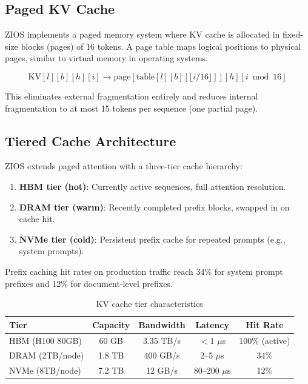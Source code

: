 \documentclass[11pt,a4paper]{article}
\begin{document}
\subsection{Paged KV Cache}

ZIOS implements a paged memory system where KV cache is allocated in fixed-size blocks (pages) of 16 tokens. A page table maps logical positions to physical pages, similar to virtual memory in operating systems.

\begin{equation}
\text{KV}[l][b][h][i] \to \text{page}[\text{table}[l][b][\lfloor i/16 \rfloor]][h][i \bmod 16]
\end{equation}

This eliminates external fragmentation entirely and reduces internal fragmentation to at most 15 tokens per sequence (one partial page).

\subsection{Tiered Cache Architecture}

ZIOS extends paged attention with a three-tier cache hierarchy:

\begin{enumerate}
  \item \textbf{HBM tier (hot)}: Currently active sequences, full attention resolution.
  \item \textbf{DRAM tier (warm)}: Recently completed prefix blocks, swapped in on cache hit.
  \item \textbf{NVMe tier (cold)}: Persistent prefix cache for repeated prompts (e.g., system prompts).
\end{enumerate}

Prefix caching hit rates on production traffic reach 34\% for system prompt prefixes and 12\% for document-level prefixes.

\begin{table}[H]
\centering
\caption{KV cache tier characteristics}
\label{tab:kv_tiers}
\begin{tabular}{lcccc}
\toprule
Tier & Capacity & Bandwidth & Latency & Hit Rate \\
\midrule
HBM (H100 80GB) & 60 GB & 3.35 TB/s & $<$1 $\mu$s & 100\% (active) \\
DRAM (2TB/node) & 1.8 TB & 400 GB/s & 2--5 $\mu$s & 34\% \\
NVMe (8TB/node) & 7.2 TB & 12 GB/s & 80--200 $\mu$s & 12\% \\
\bottomrule
\end{tabular}
\end{table}
\end{document}

